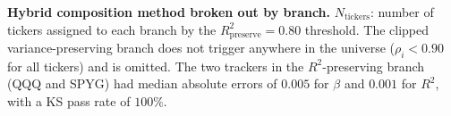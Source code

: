 
\begin{table}[tbp]
  \centering
  \caption{\textbf{Hybrid composition method broken out by branch.}
    $N_{\mathrm{tickers}}$: number of tickers assigned to each branch by
    the $R^2_{\mathrm{preserve}} = 0.80$ threshold. The clipped
    variance-preserving branch does not trigger anywhere in the
    universe ($\rho_i < 0.90$ for all tickers) and is omitted. The
    two trackers in the $R^2$-preserving branch (QQQ and SPYG) had
    median absolute errors of $0.005$ for $\beta$ and $0.001$ for
    $R^2$, with a KS pass rate of $100\%$.}
  \label{tab:branch}
  \small
  \resizebox{\textwidth}{!}{}
\end{table}

